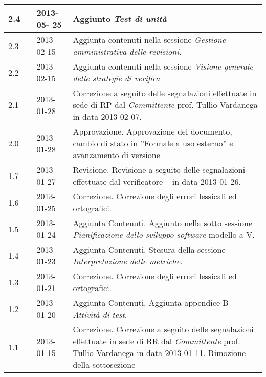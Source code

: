 \begin{longtable}{p{} p{} p{} p{}}
	    \midrule
	       	2.4		&	\MB		&	2013-05-	25 &	 Aggiunto \emph{Test di unità}\\
	    \midrule
	    	    2.3		&	\MB 		&	2013-02-15	&	Aggiunta contenuti nella sessione \emph{Gestione amministrativa delle revisioni}. \\
	    	    \midrule
	    	    2.2		&	\MB 		&	2013-02-15	&	Aggiunta contenuti nella sessione \emph{Visione generale delle strategie di verifica} \\
	    \midrule
	    	    2.1		&	\MB		&	2013-01-28		&	Correzione a seguito delle segnalazioni effettuate in sede di RP dal \textit{Committente}	prof. Tullio Vardanega in data 2013-02-07.\\
		    \midrule	
		    2.0		&	\FZ 		&	2013-01-28		&	Approvazione.\newline
												Approvazione del documento, cambio di stato in ”Formale a uso esterno” e avanzamento di versione\\
		    \midrule	
		    1.7		&	\DC 	&	2013-01-27		&	Revisione.\newline
												Revisione a seguito delle segnalazioni effettuate dal verificatore \DC~ in data 2013-01-26.\\
		     \midrule
		    1.6		&	\SL 		&	2013-01-25		&	Correzione.\newline
												Correzione degli errori lessicali ed ortografici.\\
		    \midrule			
		    1.5		&	\SL 		&	2013-01-24		&	Aggiunta Contenuti.\newline
												Aggiunto nella sotto sessione \emph{Pianificazione dello sviluppo software} modello a V.\\
		    \midrule			
		    1.4		&	\SL 		&	2013-01-23		&	Aggiunta Contenuti.\newline
												Stesura della sessione \emph{Interpretazione delle metriche}.\\
		    \midrule
		    1.3		&	\EZ 		&	2013-01-21		&	Correzione.\newline
												Correzione degli errori lessicali ed ortografici.\\
		    \midrule
		    1.2		&	\SL		&	2013-01-20		&   	Aggiunta Contenuti.\newline
												Aggiunta appendice B \emph{Attivit\`a di test}.\\
	    \midrule
		    1.1		&	\SL		&	2013-01-15		&	Correzione.\newline
												Correzione a seguito delle segnalazioni effettuate in sede di RR dal \textit{Committente} 
												prof. Tullio Vardanega in data 2013-01-11. Rimozione della sottosezione 

\end{longtable}
